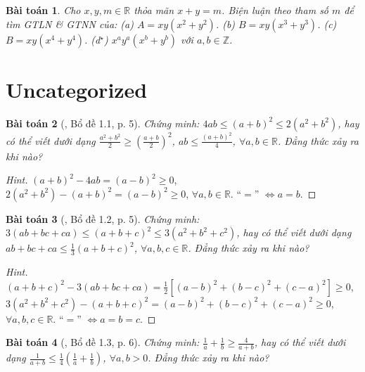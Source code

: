 \documentclass{article}
\newtheorem{baitoan}{Bài toán}
\begin{document}
\begin{baitoan}
	Cho $x,y,m\in\mathbb{R}$ thỏa mãn $x + y = m$. Biện luận theo tham số $m$ để tìm {\rm GTLN} \& {\rm GTNN} của: (a) $A = xy(x^2 + y^2)$. (b) $B = xy(x^3 + y^3)$. (c) $B = xy(x^4 + y^4)$. (d${}^\star$) $x^ay^a(x^b + y^b)$ với $a,b\in\mathbb{Z}$. 
\end{baitoan}


\section{Uncategorized}

\begin{baitoan}[\cite{Son_Nghiep_Trung_Can2021}, Bổ đề 1.1, p. 5]
	Chứng minh: $4ab\le(a + b)^2\le2(a^2 + b^2)$, hay có thể viết dưới dạng $\frac{a^2 + b^2}{2}\ge\left(\frac{a + b}{2}\right)^2$, $ab\le\frac{(a + b)^2}{4}$, $\forall a,b\in\mathbb{R}$. Đẳng thức xảy ra khi nào?
\end{baitoan}

\begin{proof}[Hint]
	$(a + b)^2 - 4ab = (a - b)^2\ge 0$, $2(a^2 + b^2) - (a + b)^2 = (a - b)^2\ge 0$, $\forall a,b\in\mathbb{R}$. ``$=$'' $\Leftrightarrow a = b$.
\end{proof}

\begin{baitoan}[\cite{Son_Nghiep_Trung_Can2021}, Bổ đề 1.2, p. 5]
	Chứng minh: $3(ab + bc + ca)\le(a + b + c)^2\le3(a^2 + b^2 + c^2)$, hay có thể viết dưới dạng $ab + bc + ca\le\frac{1}{3}(a + b + c)^2$, $\forall a,b,c\in\mathbb{R}$. Đẳng thức xảy ra khi nào?
\end{baitoan}

\begin{proof}[Hint]
	$(a + b + c)^2 - 3(ab + bc + ca) = \frac{1}{2}\left[(a - b)^2 + (b - c)^2 + (c - a)^2\right]\ge 0$, $3(a^2 + b^2 + c^2) - (a + b + c)^2 = (a - b)^2 + (b - c)^2 + (c - a)^2\ge 0$, $\forall a,b,c\in\mathbb{R}$. ``$=$'' $\Leftrightarrow a = b = c$.
\end{proof}

\begin{baitoan}[\cite{Son_Nghiep_Trung_Can2021}, Bổ đề 1.3, p. 6]
	Chứng minh: $\frac{1}{a} + \frac{1}{b}\ge\frac{4}{a + b}$, hay có thể viết dưới dạng $\frac{1}{a + b}\le\frac{1}{4}\left(\frac{1}{a} + \frac{1}{b}\right)$, $\forall a,b > 0$. Đẳng thức xảy ra khi nào?
\end{baitoan}
\end{document}

